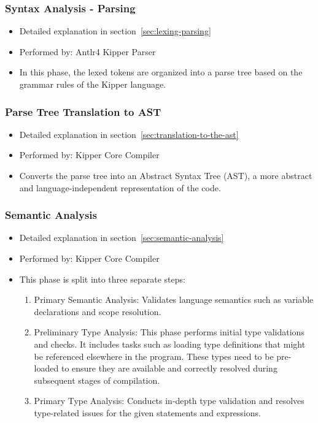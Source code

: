 \subsubsection{Syntax Analysis - Parsing}
\begin{itemize}
	\item Detailed explanation in section~\ref{sec:lexing-parsing}
	\item Performed by: Antlr4 Kipper Parser
	\item In this phase, the lexed tokens are organized into a parse tree based on the grammar rules of the Kipper language.
\end{itemize}

\subsubsection{Parse Tree Translation to AST}
\begin{itemize}
	\item Detailed explanation in section~\ref{sec:translation-to-the-ast}
	\item Performed by: Kipper Core Compiler
	\item Converts the parse tree into an Abstract Syntax Tree (AST), a more abstract and language-independent representation of the code.
\end{itemize}

\subsubsection{Semantic Analysis}
\begin{itemize}
	\item Detailed explanation in section~\ref{sec:semantic-analysis}
	\item Performed by: Kipper Core Compiler
	\item This phase is split into three separate steps:
	\begin{enumerate}
		\item Primary Semantic Analysis: Validates language semantics such as variable declarations and scope resolution.
		\item Preliminary Type Analysis: This phase performs initial type validations and checks. It includes tasks such as loading type definitions that might be referenced elsewhere in the program. These types need to be pre-loaded to ensure they are available and correctly resolved during subsequent stages of compilation.
		\item Primary Type Analysis: Conducts in-depth type validation and resolves type-related issues for the given statements and expressions.
	\end{enumerate}
\end{itemize}

